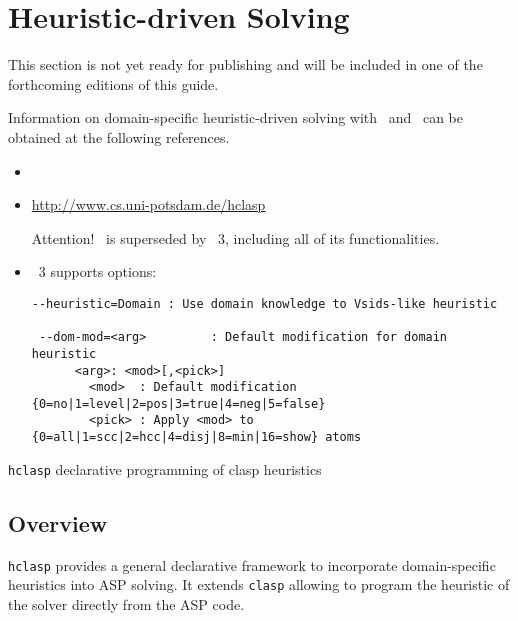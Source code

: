 
\section{Heuristic-driven Solving}
\label{sec:heuristic}

This section is not yet ready for publishing
and will be included in one of the forthcoming editions of this guide.

Information on domain-specific heuristic-driven solving with \clasp\ and \clingo\ can be obtained at the following references.

\begin{itemize}
\item \cite{gekaotroscwa13a}
\item \url{http://www.cs.uni-potsdam.de/hclasp}


  Attention! \hclasp\ is superseded by \clasp~3,
  including all of its functionalities.
\item \clasp~3 supports options:
\scriptsize\begin{lstlisting}[numbers=none]
 --heuristic=Domain : Use domain knowledge to Vsids-like heuristic

 --dom-mod=<arg>         : Default modification for domain heuristic
      <arg>: <mod>[,<pick>]
        <mod>  : Default modification {0=no|1=level|2=pos|3=true|4=neg|5=false}
        <pick> : Apply <mod> to {0=all|1=scc|2=hcc|4=disj|8=min|16=show} atoms
\end{lstlisting}
\end{itemize}

\iffalse
\texttt{hclasp} declarative programming of clasp heuristics 



\subsection{Overview}

\texttt{hclasp} provides a general declarative framework to incorporate domain-specific heuristics into ASP solving. It extends \texttt{clasp} allowing to program the heuristic of the solver directly from the ASP code. 

